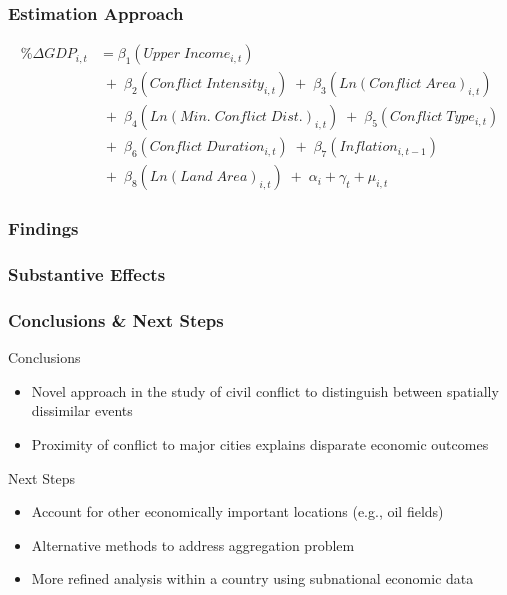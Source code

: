 \begin{frame}
\frametitle{Estimation Approach}

\begin{align*}
	\% \Delta GDP_{i,t} &= \beta_{1}(Upper \; Income_{i,t}) \\
	& \;+\; \beta_{2}(Conflict \; Intensity_{i,t}) \;+\; \beta_{3}(Ln(Conflict \; Area)_{i,t}) \\
	& \;+\; \beta_{4}(Ln(Min. \; Conflict \; Dist.)_{i,t}) \;+\; \beta_{5}(Conflict \; Type_{i,t}) \\
	& \;+\; \beta_{6}(Conflict \; Duration_{i,t}) \;+\; \beta_{7}(Inflation_{i,t-1}) \\
	& \;+\; \beta_{8}(Ln(Land \; Area)_{i,t}) \;+\; \alpha_{i} + \gamma_{t} + \mu_{i,t}
\end{align*}

\end{frame}

\begin{frame}
\frametitle{Findings}

\begin{figure}[ht]
	\centering
	\resizebox{.8\textwidth}{!}{}
\end{figure}

\end{frame}

\begin{frame}
\frametitle{Substantive Effects}

\begin{figure}[ht]
	\centering
	\resizebox{.9\textwidth}{!}{}
\end{figure}

\end{frame}

\begin{frame}
\frametitle{Conclusions \& Next Steps}

\begin{block}{Conclusions}
\begin{itemize}
	\item Novel approach in the study of civil conflict to distinguish between spatially dissimilar events
	\item Proximity of conflict to major cities explains disparate economic outcomes
\end{itemize}
\end{block}

\begin{block}{Next Steps}
\begin{itemize}
\item Account for other economically important locations (e.g., oil fields)
\item Alternative methods to address aggregation problem
\item More refined analysis within a country using subnational economic data
\end{itemize}
\end{block}

\end{frame}

